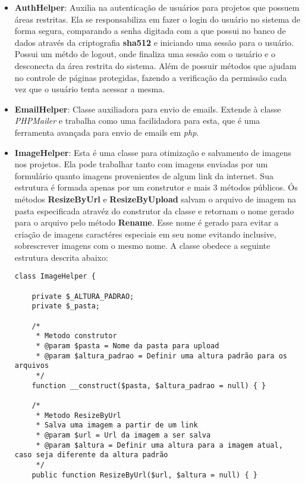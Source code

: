            \begin{itemize}
                \item\textbf{AuthHelper}: Auxilia na autenticação de usuários para projetos que possuem áreas restritas. Ela se responsabiliza em fazer o login do usuário no sistema de forma segura, comparando a senha digitada com a que possui no banco de dados através da criptografia \textbf{sha512} e iniciando uma sessão para o usuário. Possui um métdo de logout, onde finaliza uma sessão com o usuário e o desconecta da área restrita do sistema. Além de possuir métodos que ajudam no controle de páginas protegidas, fazendo a verificação da permissão cada vez que o usuário tenta acessar a mesma.

                \item\textbf{EmailHelper}: Classe auxiliadora para envio de emails. Extende à classe \emph{PHPMailer} e trabalha como uma facilidadora para esta, que é uma ferramenta avançada para envio de emails em \emph{php}.

                \item\textbf{ImageHelper}: Esta é uma classe para otimização e salvamento de imagens nos projetos. Ela pode trabalhar tanto com imagens enviadas por um formulário quanto imagens provenientes de algum link da internet. Sua estrutura é formada apenas por um construtor e mais 3 métodos públicos. Ós métodos \textbf{ResizeByUrl} e \textbf{ResizeByUpload} salvam o arquivo de imagem na pasta especificada atravéz do construtor da classe e retornam o nome gerado para o arquivo pelo método \textbf{Rename}. Esse nome é gerado para evitar a criação de imagens caractéres especiais em seu nome evitando inclusive, sobrescrever imagens com o mesmo nome. A classe obedece a seguinte estrutura descrita abaixo:

\begin{lstlisting}
class ImageHelper {

    private $_ALTURA_PADRAO;
    private $_pasta;

    /*
     * Metodo construtor
     * @param $pasta = Nome da pasta para upload
     * @param $altura_padrao = Definir uma altura padrão para os arquivos
     */
    function __construct($pasta, $altura_padrao = null) { }

    /*
     * Metodo ResizeByUrl
     * Salva uma imagem a partir de um link
     * @param $url = Url da imagem a ser salva
     * @param $altura = Definir uma altura para a imagem atual, caso seja diferente da altura padrão
     */
    public function ResizeByUrl($url, $altura = null) { }


\end{lstlisting}
\end{itemize}
